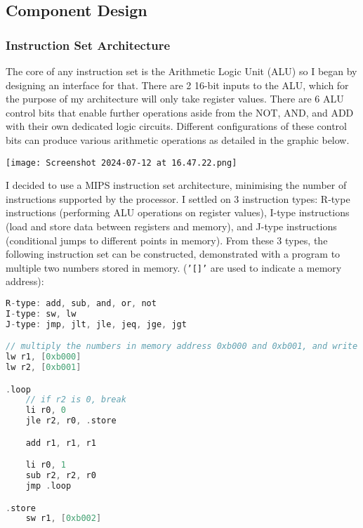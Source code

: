\bigskip


\subsection{Component Design}
\subsubsection{Instruction Set Architecture}
\label{sec:ISADesign}
The core of any instruction set is the Arithmetic Logic Unit (ALU) so I began by designing an interface for that. There are 2 16-bit inputs to the ALU, which for the purpose of my architecture will only take register values. There are 6 ALU control bits that enable further operations aside from the NOT, AND, and ADD with their own dedicated logic circuits. Different configurations of these control bits can produce various arithmetic operations as detailed in the graphic below.

\bigskip

\texttt{[image: Screenshot 2024-07-12 at 16.47.22.png]}

\bigskip

I decided to use a MIPS instruction set architecture, minimising the number of instructions supported by the processor. I settled on 3 instruction types: R-type instructions (performing ALU operations on register values), I-type instructions (load and store data between registers and memory), and J-type instructions (conditional jumps to different points in memory). From these 3 types, the following instruction set can be constructed, demonstrated with a program to multiple two numbers stored in memory. (\texttt{'[]'} are used to indicate a memory address):

\begin{lstlisting}[language=C]
R-type: add, sub, and, or, not
I-type: sw, lw
J-type: jmp, jlt, jle, jeq, jge, jgt

// multiply the numbers in memory address 0xb000 and 0xb001, and write the answer to 0xb002
lw r1, [0xb000]
lw r2, [0xb001]

.loop
    // if r2 is 0, break
    li r0, 0
    jle r2, r0, .store

    add r1, r1, r1

    li r0, 1
    sub r2, r2, r0
    jmp .loop

.store
    sw r1, [0xb002]
\end{lstlisting}

